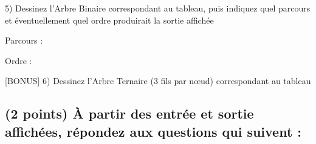 \documentclass[11pt,a4paper]{article}
\begin{document}
\vspace*{-1.5cm}


\begin{center}

5) Dessinez l'Arbre Binaire correspondant au tableau, puis indiquez quel parcours et éventuellement quel ordre produirait la sortie affichée


\bigskip

\begin{table}[ht!]
  \centering
  \begin{minipage}{0.65\textwidth}

\phantom{42}

  \end{minipage}
  \hfillx
  \begin{minipage}{0.01\textwidth}


  \end{minipage}
  \hfillx
  \begin{minipage}{0.30\textwidth}
    \raggedright

Parcours :

\bigskip
\bigskip
\bigskip
\bigskip

Ordre :

  \end{minipage}
\end{table}

\bigskip

[BONUS] 6) Dessinez l'Arbre Ternaire (3 fils par nœud) correspondant au tableau

\end{center}


\clearpage

\subsection{(2 points) \`A partir des entrée et sortie affichées, répondez aux questions qui suivent : }
\end{document}
